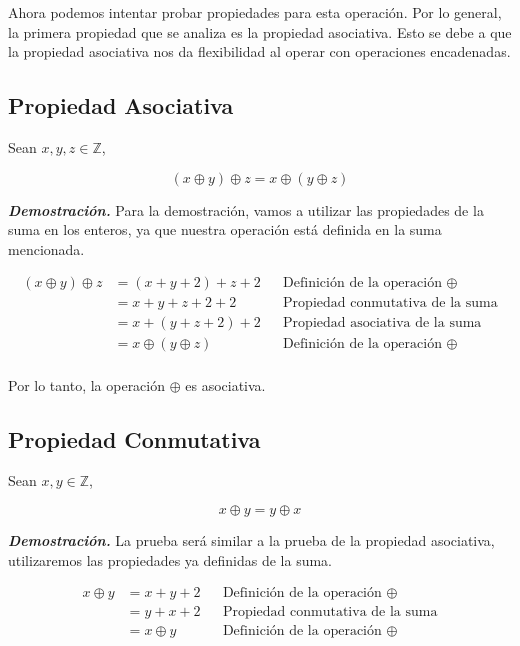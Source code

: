 \documentclass{report}
\begin{document}
Ahora podemos intentar probar propiedades para esta operación. Por lo general, la primera propiedad que se analiza es la propiedad asociativa. Esto se debe a que la propiedad asociativa nos da flexibilidad al operar con operaciones encadenadas.

\subsection*{Propiedad Asociativa}

Sean $x, y, z \in \mathbb{Z}$,

$$(x\oplus y) \oplus z = x \oplus (y \oplus z)$$

\textit{\textbf{Demostración.}} Para la demostración, vamos a utilizar las propiedades de la suma en los enteros, ya que nuestra operación está definida en la suma mencionada.

\begin{align*}
    (x\oplus y) \oplus z &= (x + y + 2) + z + 2 &&\text{Definición de la operación } \oplus\\
    &= x + y + z + 2 + 2 &&\text{Propiedad conmutativa de la suma}\\
    &= x + (y + z + 2) + 2 &&\text{Propiedad asociativa de la suma}\\
    &= x \oplus (y \oplus z) &&\text{Definición de la operación } \oplus\\
\end{align*}

Por lo tanto, la operación $\oplus$ es asociativa.

\subsection*{Propiedad Conmutativa}

Sean $x, y \in \mathbb{Z}$,

$$x\oplus y = y \oplus x $$

\textit{\textbf{Demostración.}} La prueba será similar a la prueba de la propiedad asociativa, utilizaremos las propiedades ya definidas de la suma.

\begin{align*}
    x\oplus y &= x + y + 2 &&\text{Definición de la operación } \oplus\\
    &= y + x + 2 &&\text{Propiedad conmutativa de la suma}\\
    &= x \oplus y &&\text{Definición de la operación } \oplus\\
\end{align*}
\end{document}
